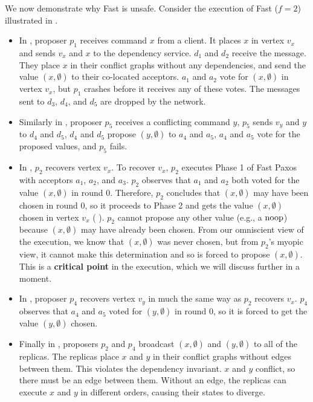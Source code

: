 We now demonstrate why Fast \BPaxos{} is unsafe. Consider the execution of Fast
\BPaxos{} ($f = 2$) illustrated in .
\begin{itemize}
  \item
    In , proposer $p_1$ receives command $x$ from a
    client. It places $x$ in vertex $v_x$ and sends $v_x$ and $x$ to the
    dependency service. $d_1$ and $d_2$ receive the message. They place $x$ in
    their conflict graphs without any dependencies, and send the value $(x,
    \emptyset{})$ to their co-located acceptors. $a_1$ and $a_2$ vote for $(x,
    \emptyset)$ in vertex $v_x$, but $p_1$ crashes before it receives any of
    these votes. The messages sent to $d_3$, $d_4$, and $d_5$ are dropped by
    the network.

 \item
    Similarly in , proposer $p_5$ receives a conflicting
    command $y$, $p_5$ sends $v_y$ and $y$ to $d_4$ and $d_5$, $d_4$ and $d_5$
    propose $(y, \emptyset{})$  to $a_4$ and $a_5$, $a_4$ and $a_5$ vote for
    the proposed values, and $p_5$ fails.

  \item
    In , $p_2$ recovers vertex $v_x$. To recover $v_x$,
    $p_2$ executes Phase 1 of Fast Paxos with acceptors $a_1$, $a_2$, and
    $a_3$. $p_2$ observes that $a_1$ and $a_2$ both voted for the value $(x,
    \emptyset{})$ in round $0$. Therefore, $p_2$ concludes that $(x,
    \emptyset{})$ may have been chosen in round $0$, so it proceeds to Phase 2
    and gets the value $(x, \emptyset)$ chosen in vertex $v_x$
    ( ). $p_2$ cannot propose any
    other value (e.g., a $\text{noop}$) because $(x, \emptyset{})$ may have already
    been chosen. From our omniscient view of the execution, we know that $(x,
    \emptyset)$ was never chosen, but from $p_2$'s myopic view, it cannot make
    this determination and so is forced to propose $(x, \emptyset{})$. This is
    a \textbf{critical point} in the execution, which we will discuss further
    in a moment.

  \item
    In , proposer $p_4$ recovers vertex $v_y$ in much
    the same way as $p_2$ recovers $v_x$. $p_4$ observes that $a_4$ and $a_5$
    voted for $(y, \emptyset)$ in round 0, so it is forced to get the value
    $(y, \emptyset{})$ chosen.

  \item
    Finally in , proposers $p_2$ and $p_4$ broadcast $(x,
    \emptyset)$ and $(y, \emptyset)$ to all of the replicas. The replicas place
    $x$ and $y$ in their conflict graphs without edges between them. This
    violates the dependency invariant. $x$ and $y$ conflict, so there must be
    an edge between them. Without an edge, the replicas can execute $x$ and $y$
    in different orders, causing their states to diverge.
\end{itemize}

